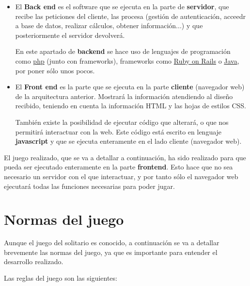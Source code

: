\documentclass{\ClassPath/viu-tfm-template}
\begin{document}
\begin{itemize}
    \item El \textbf{Back end} es el software que se ejecuta en la parte de \textbf{servidor}, que recibe las peticiones del cliente, las procesa (gestión de autenticación, acceedr a base de datos, realizar cálculos, obtener información...) y que posteriormente el servidor devolverá.

    En este apartado de \textbf{backend} se hace uso de lenguajes de programación como \href{https://www.php.net/}{php} (junto con frameworks), frameworks como \href{https://rubyonrails.org/}{Ruby on Rails} o \href{https://www.java.com/es/}{Java}, por poner sólo unos pocos.

    \item El \textbf{Front end} es la parte que se ejecuta en la parte \textbf{cliente} (navegador web) de la arquitectura anterior. Mostrará la información atendiendo al diseño recibido, teniendo en cuenta la información HTML y las hojas de estilos CSS.

    También existe la posibilidad de ejecutar código que alterará, o que nos permitirá interactuar con la web. Este código está escrito en lenguaje \textbf{javascript} y que se ejecuta enteramente en el lado cliente (navegador web).
\end{itemize}

El juego realizado, que se va a detallar a continuación, ha sido realizado para que pueda ser ejecutado enteramente en la parte \textbf{frontend}. Esto hace que no sea necesario un servidor con el que interactuar, y por tanto sólo el navegador web ejecutará todas las funciones necesarias para poder jugar.


\chapter{Normas del juego}

Aunque el juego del solitario es conocido, a continuación se va a detallar brevemente las normas del juego, ya que es importante para entender el desarrollo realizado.

Las reglas del juego son las siguientes:
\end{document}
